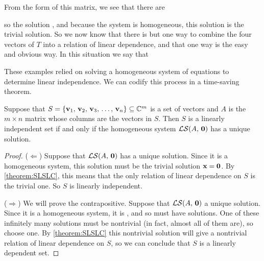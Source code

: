 \documentclass{ximera}
\begin{document}
\begin{example}
From the form of this matrix, we see that there are 
\begin{multipleChoice}
\end{multipleChoice}
so the solution , and because the system is homogeneous, this solution is the trivial solution.  So we now know that there is but one way to combine the four vectors of $T$ into a relation of linear dependence, and that one way is the easy and obvious way.  In this situation we say that 
\begin{multipleChoice}
\end{multipleChoice}
\end{example}

These examples relied on solving a homogeneous system of equations to
determine linear independence.  We can codify this process in a
time-saving theorem.

\begin{theorem}
\label{theorem:LIVHS}
Suppose that $S=\left\{\mathbf{v}_{1},\,\mathbf{v}_{2},\,\mathbf{v}_{3},\,\ldots,\,\mathbf{v}_{n}\right\}\subseteq\mathbb{C}^{m}$ is a set
of vectors and $A$ is the $m\times n$ matrix whose columns are the
vectors in $S$.  Then $S$ is a linearly independent set if and only if
the homogeneous system $\mathcal{LS}\!\left(A,\,\mathbf{0}\right)$ has a unique solution.


\begin{proof}
  ($\Leftarrow$) Suppose that $\mathcal{LS}\!\left(A,\,\mathbf{0}\right)$ has a unique solution.
  Since it is a homogeneous system, this solution must be the trivial
  solution $\mathbf{x}=\mathbf{0}$.  By \ref{theorem:SLSLC}, this means
  that the only relation of linear dependence on $S$ is the trivial
  one.  So $S$ is linearly independent.

  ($\Rightarrow$) We will prove the contrapositive.  Suppose that
  $\mathcal{LS}\!\left(A,\,\mathbf{0}\right)$  a unique solution.  Since it is a
  homogeneous system, it is
  , and
  so must have  solutions.  One of these infinitely many
  solutions must be nontrivial (in fact, almost all of them are), so
  choose one.  By \ref{theorem:SLSLC} this nontrivial solution will
  give a nontrivial relation of linear dependence on $S$, so we can
  conclude that $S$ is a linearly dependent set.
\end{proof}
\end{theorem}
\end{document}
